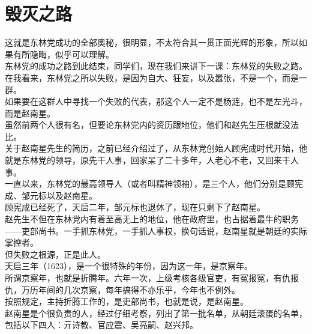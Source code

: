 \section{毁灭之路}
\ifnum{}
	\begin{multicols}{\theparacolNo}
\fi
这就是东林党成功的全部奥秘，很明显，不太符合其一贯正面光辉的形象，所以如果有所隐晦，似乎可以理解。\\

东林党的成功之路到此结束，同学们，现在我们来讲下一课：东林党的失败之路。\\

在我看来，东林党之所以失败，是因为自大、狂妄，以及嚣张，不是一个，而是一群。\\

如果要在这群人中寻找一个失败的代表，那这个人一定不是杨涟，也不是左光斗，而是赵南星。\\

虽然前两个人很有名，但要论东林党内的资历跟地位，他们和赵先生压根就没法比。\\

关于赵南星先生的简历，之前已经介绍过了，从东林党创始人顾宪成时代开始，他就是东林党的领导，原先干人事，回家呆了二十多年，人老心不老，又回来干人事。\\

一直以来，东林党的最高领导人（或者叫精神领袖），是三个人，他们分别是顾宪成、邹元标以及赵南星。\\

顾宪成已经死了，天启二年，邹元标也退休了，现在只剩下了赵南星。\\

赵先生不但在东林党内有着至高无上的地位，他在政府里，也占据着最牛的职务——吏部尚书。一手抓东林党，一手抓人事权，换句话说，赵南星就是朝廷的实际掌控者。\\

但失败之根源，正是此人。\\

天启三年（1623），是一个很特殊的年份，因为这一年，是京察年。\\

所谓京察年，也就是折腾年。六年一次，上级考核各级官吏，有冤报冤，有仇报仇，万历年间的几次京察，每年搞得不亦乐乎，今年也不例外。\\

按照规定，主持折腾工作的，是吏部尚书，也就是说，是赵南星。\\

赵南星是个很负责的人，经过仔细考察，列出了第一批名单，从朝廷滚蛋的名单，包括以下四人：亓诗教、官应震、吴亮嗣、赵兴邦。\\


\end{multicols}
